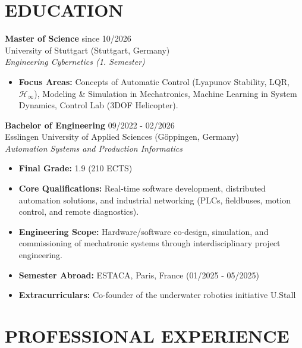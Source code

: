 \documentclass[10pt,a4paper]{article}
\begin{document}
\begin{minipage}[t]{0.66\textwidth}
    
    \section*{EDUCATION}
    \textbf{Master of Science} \hfill since 10/2026\\
    University of Stuttgart (Stuttgart, Germany)\\[0.2em]
    \textit{Engineering Cybernetics (1. Semester)}
    \begin{itemize}
        \item \textbf{Focus Areas:} Concepts of Automatic Control (Lyapunov Stability, LQR, $\mathcal{H}_{\infty}$), Modeling \& Simulation in Mechatronics, Machine Learning in System Dynamics, Control Lab (3DOF Helicopter).
    \end{itemize}
    \vspace{0.6em}

    \textbf{Bachelor of Engineering} \hfill 09/2022 - 02/2026\\
    Esslingen University of Applied Sciences (Göppingen, Germany)\\[0.2em]
    \textit{Automation Systems and Production Informatics}
    \begin{itemize}
        \item \textbf{Final Grade:} 1.9 (210 ECTS)
        \item \textbf{Core Qualifications:} Real-time software development, distributed automation solutions, and industrial networking (PLCs, fieldbuses, motion control, and remote diagnostics).
        \item \textbf{Engineering Scope:} Hardware/software co-design, simulation, and commissioning of mechatronic systems through interdisciplinary project engineering.
        \item \textbf{Semester Abroad:} ESTACA, Paris, France (01/2025 - 05/2025)
        \item \textbf{Extracurriculars:} Co-founder of the underwater robotics initiative U.Stall
    \end{itemize}
    
    \vspace{0.8em}

    \section*{PROFESSIONAL EXPERIENCE}
    

\end{minipage}
\end{document}
